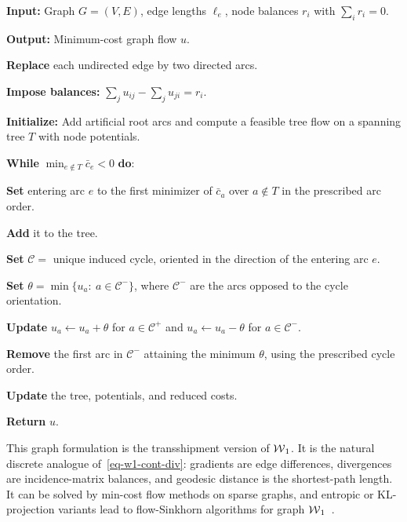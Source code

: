 \begin{alg}\label{alg:graph-beckmann-network-simplex}
\textbf{Input:} Graph $G=(V,E)$, edge lengths $\ell_e$, node balances $r_i$ with $\sum_ir_i=0$.

\textbf{Output:} Minimum-cost graph flow $u$.

\textbf{Replace} each undirected edge by two directed arcs.

\textbf{Impose balances:}
\(\sum_j u_{ij}-\sum_j u_{ji}=r_i .\)

\textbf{Initialize:} Add artificial root arcs and compute a feasible tree flow on a spanning tree $T$ with node potentials.

\textbf{While} \(\min_{e\notin T}\bar c_e<0\) \textbf{do}:
\begin{algblock}

\textbf{Set} entering arc \(e\) to the first minimizer of \(\bar c_a\) over \(a\notin T\) in the prescribed arc order.

\textbf{Add} it to the tree.

\textbf{Set} $\mathcal C=$ unique induced cycle, oriented in the direction of the entering arc \(e\).

\textbf{Set} \(\theta=\min\{u_a:\ a\in\mathcal C^-\}\), where \(\mathcal C^-\) are the arcs opposed to the cycle orientation.

\textbf{Update} \(u_a\leftarrow u_a+\theta\) for \(a\in\mathcal C^+\) and \(u_a\leftarrow u_a-\theta\) for \(a\in\mathcal C^-\).

\textbf{Remove} the first arc in \(\mathcal C^-\) attaining the minimum \(\theta\), using the prescribed cycle order.

\textbf{Update} the tree, potentials, and reduced costs.

\end{algblock}
\algreturnskip
\textbf{Return} $u$.
\end{alg}

This graph formulation is the transshipment version of $\operatorname{\mathcal{W}}_1$. It is the natural discrete analogue of~\eqref{eq-w1-cont-div}: gradients are edge differences, divergences are incidence-matrix balances, and geodesic distance is the shortest-path length. It can be solved by min-cost flow methods on sparse graphs, and entropic or KL-projection variants lead to flow-Sinkhorn algorithms for graph $\operatorname{\mathcal{W}}_1$~\cite{Beckmann52,peyre2026robust}.
